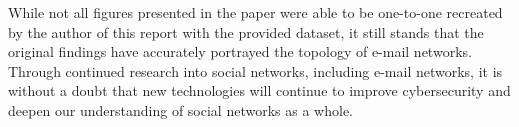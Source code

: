 \documentclass[11pt]{article}
\begin{document}
\begin{multicols}{2}
While not all figures presented in the paper were able to be one-to-one recreated by the author of this report with the provided dataset, it still stands that the original findings have accurately portrayed the topology of e-mail networks. Through continued research into social networks, including e-mail networks, it is without a doubt that new technologies will continue to improve cybersecurity and deepen our understanding of social networks as a whole.

\end{multicols}

\newpage
\printbibliography %
\end{document}
